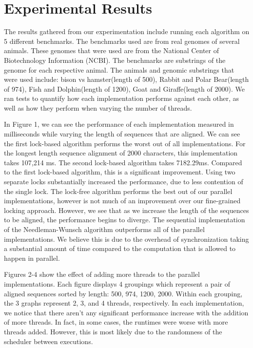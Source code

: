 \documentclass[letterpaper, 10 pt, conference]{IEEEconf}
\begin{document}
\section{Experimental Results}
The results gathered from our experimentation include running each algorithm on 5 different benchmarks. The benchmarks used are from real genomes of several animals. These genomes that were used are from the National Center of Biotechnology Information (NCBI). The benchmarks are substrings of the genome for each respective animal. The animals and genomic substrings that were used include: bison vs hamster(length of 500), Rabbit and Polar Bear(length of 974), Fish and Dolphin(length of 1200), Goat and Giraffe(length of 2000). We ran tests to quantify how each implementation performs against each other, as well as how they perform when varying the number of threads. 

In Figure 1, we can see the performance of each implementation measured in milliseconds while varying the length of sequences that are aligned. We can see the first lock-based algorithm performs the worst out of all implementations. For the longest length sequence alignment of 2000 characters, this implementation takes 107,214 ms. The second lock-based algorithm takes 7182.29ms. Compared to the first lock-based algorithm, this is a significant improvement. Using two separate locks substantially increased the performance, due to less contention of the single lock. The lock-free algorithm performs the best out of our parallel implementations, however is not much of an improvement over our fine-grained locking approach. However, we see that as we increase the length of the sequences to be aligned, the performance begins to diverge. The sequential implementation of the Needleman-Wunsch algorithm outperforms all of the parallel implementations. We believe this is due to the overhead of synchronization taking a substantial amount of time compared to the computation that is allowed to happen in parallel. 

Figures 2-4 show the effect of adding more threads to the parallel implementations. Each figure displays 4 groupings which represent a pair of aligned sequences sorted by length: 500, 974, 1200, 2000. Within each grouping, the 3 graphs represent 2, 3, and 4 threads, respectively. In each implementation, we notice that there aren't any significant performance increase with the addition of more threads. In fact, in some cases, the runtimes were worse with more threads added. However, this is most likely due to the randomness of the scheduler between executions. 
\end{document}
